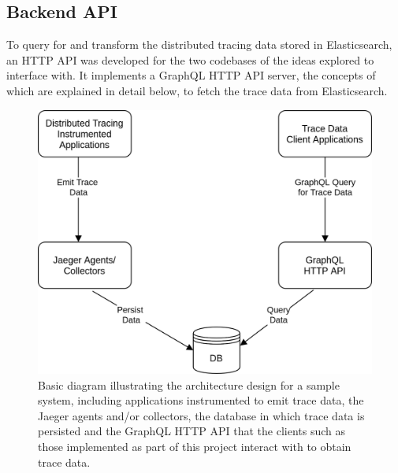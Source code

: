 \documentclass[12pt,pdftex,titlepage]{report}
\begin{document}


            \subsection{Backend API}
                To query for and transform the distributed tracing data stored in Elasticsearch, an HTTP API was developed for the two codebases of the ideas explored to interface with.
                It implements a GraphQL HTTP API server, the concepts of which are explained in detail below, to fetch the trace data from Elasticsearch. 
                
                \begin{figure}[hbt!]
                    \centering
                    \includegraphics[scale=0.2]{arch.png}
                    \caption{Basic diagram illustrating the architecture design for a sample system, including applications instrumented to emit trace data, the Jaeger agents and/or collectors,
                    the database in which trace data is persisted and the GraphQL HTTP API that the clients such as those implemented as part of this project interact with to obtain trace data.}
                    \label{}
                \end{figure}
\end{document}
